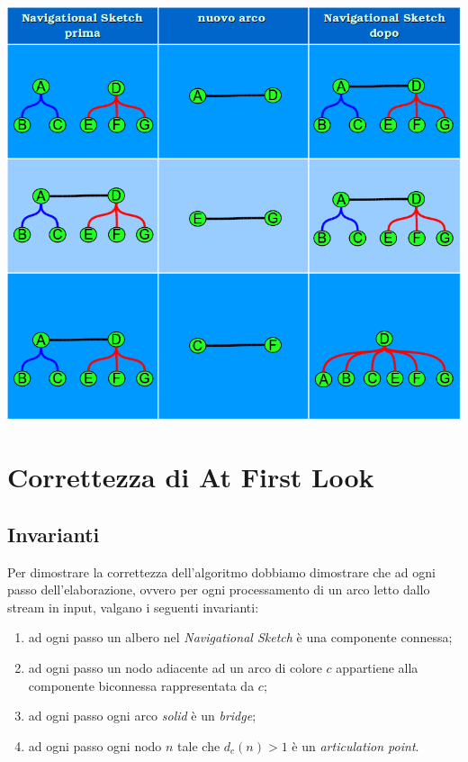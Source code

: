 \documentclass[a4paper,11pt]{report}
\begin{document}
\paragraph{}
\centerline{\includegraphics[width=150mm]{images/modifiche_ns.png}} 
\section{Correttezza di At First Look}\label{Correttezza di At First Look}
\subsection{Invarianti}
Per dimostrare la correttezza dell'algoritmo dobbiamo dimostrare che ad ogni passo dell'elaborazione, ovvero per ogni processamento di
un arco letto dallo stream in input, valgano i seguenti invarianti:
\begin{enumerate}
 \item ad ogni passo un albero nel \emph{Navigational Sketch} è una componente connessa;
 \item ad ogni passo un nodo adiacente ad un arco di colore $c$ appartiene alla componente biconnessa rappresentata da $c$;
 \item ad ogni passo ogni arco \emph{solid} è un \emph{bridge};
 \item ad ogni passo ogni nodo $n$ tale che $d_c(n) > 1$ è un \emph{articulation point}.
\end{enumerate}
\end{document}
